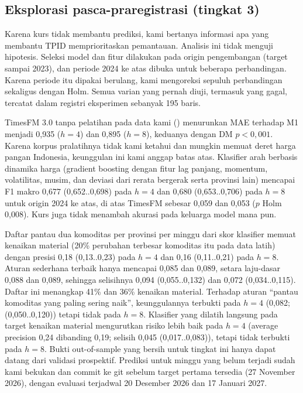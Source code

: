 \documentclass[11pt,a4paper]{article}
\makeatletter
\newcommand{\kg@one}[2]{\ifcsdef{#1@#2}{\csuse{#1@#2}}{\textbf{??#2}\PackageWarning{kagami}{Rujukan tak dikenal: #2}}}
\newcommand{\kg@item}[1]{\kg@sep\kg@one{refp}{#1}\def\kg@sep{; }}
\newcommand{\citep}[1]{\begingroup\def\kg@sep{}(\forcsvlist{\kg@item}{#1})\endgroup}
\newcommand{\ci}[2]{(#1..#2)}
\makeatother
\begin{document}
\subsection{Eksplorasi pasca-praregistrasi (tingkat 3)}

Karena kurs tidak membantu prediksi, kami bertanya informasi apa yang membantu TPID memprioritaskan pemantauan. Analisis ini
tidak menguji hipotesis. Seleksi model dan fitur dilakukan pada origin pengembangan (target sampai 2023), dan periode 2024 ke atas
dibuka untuk beberapa perbandingan. Karena periode itu dipakai berulang, kami mengoreksi sepuluh perbandingan sekaligus dengan Holm.
Semua varian yang pernah diuji, termasuk yang gagal, tercatat dalam registri eksperimen sebanyak 195 baris.

TimesFM 3.0 tanpa pelatihan pada data kami \citep{das2024,google2026} menurunkan MAE terhadap M1 menjadi 0,935 ($h=4$) dan 0,895
($h=8$), keduanya dengan DM $p<0,001$. Karena korpus pralatihnya tidak kami ketahui dan mungkin memuat deret harga pangan Indonesia,
keunggulan ini kami anggap batas atas. Klasifier arah berbasis dinamika harga (gradient boosting dengan fitur lag panjang, momentum,
volatilitas, musim, dan deviasi dari rerata bergerak serta provinsi lain) mencapai F1 makro 0,677 \ci{0,652}{0,698} pada $h=4$ dan
0,680 \ci{0,653}{0,706} pada $h=8$ untuk origin 2024 ke atas, di atas TimesFM sebesar 0,059 dan 0,053 ($p$ Holm 0,008). Kurs juga
tidak menambah akurasi pada keluarga model mana pun.

Daftar pantau dua komoditas per provinsi per minggu dari skor klasifier memuat kenaikan material (20\% perubahan terbesar
komoditas itu pada data latih) dengan presisi 0,18 \ci{0,13}{0,23} pada $h=4$ dan 0,16 \ci{0,11}{0,21} pada $h=8$. Aturan sederhana
terbaik hanya mencapai 0,085 dan 0,089, setara laju-dasar 0,088 dan 0,089, sehingga selisihnya 0,094 \ci{0,055}{0,132} dan 0,072
\ci{0,034}{0,115}. Daftar ini menangkap 41\% dan 36\% kenaikan material. Terhadap aturan ``pantau komoditas yang paling sering naik'',
keunggulannya terbukti pada $h=4$ (0,082; \ci{0,050}{0,120}) tetapi tidak pada $h=8$. Klasifier yang dilatih langsung pada target
kenaikan material mengurutkan risiko lebih baik pada $h=4$ (average precision 0,24 dibanding 0,19; selisih 0,045 \ci{0,017}{0,083}),
tetapi tidak terbukti pada $h=8$. Bukti out-of-sample yang bersih untuk tingkat ini hanya dapat datang dari validasi prospektif.
Prediksi untuk minggu yang belum terjadi sudah kami bekukan dan commit ke git sebelum target pertama tersedia (27 November 2026),
dengan evaluasi terjadwal 20 Desember 2026 dan 17 Januari 2027.
\end{document}
